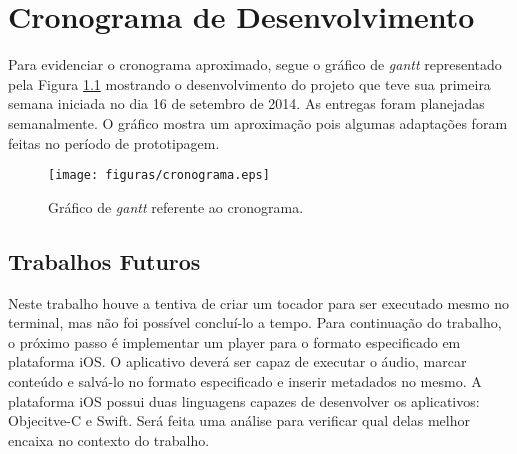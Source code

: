 \chapter[Cronograma de Desenvolvimento]{Cronograma de Desenvolvimento}\label{cap7}

Para evidenciar o cronograma aproximado, segue o gráfico de \textit{gantt} representado pela Figura \ref{cronograma} mostrando o desenvolvimento do projeto que teve sua primeira semana iniciada no dia 16 de setembro de 2014. As entregas foram planejadas semanalmente. O gráfico mostra um aproximação pois algumas adaptações foram feitas no período de prototipagem.


 \begin{figure}[ht]
	\centering
		\texttt{[image: figuras/cronograma.eps]}
	\caption{Gráfico de \textit{gantt} referente ao cronograma.}
	\label{cronograma}
\end{figure}

\section{Trabalhos Futuros}

Neste trabalho houve a tentiva de criar um tocador para ser executado mesmo no terminal, mas não foi possível concluí-lo a tempo. Para continuação do trabalho, o próximo passo é implementar um player para o formato especificado em plataforma iOS. O aplicativo deverá ser capaz de executar o áudio, marcar conteúdo e salvá-lo no formato especificado e inserir metadados no mesmo. A plataforma iOS possui duas linguagens capazes de desenvolver os aplicativos: Objecitve-C e Swift. Será feita uma análise para verificar qual delas melhor encaixa no contexto do trabalho. 